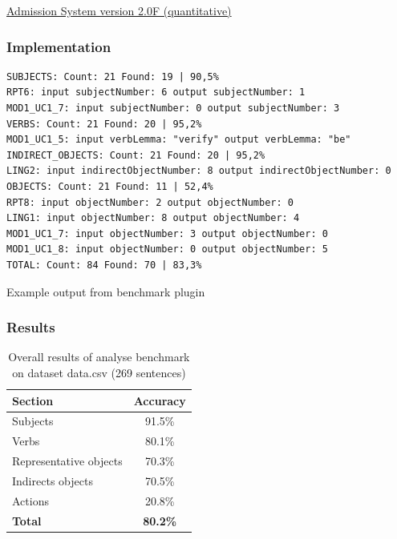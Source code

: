 \href{http://ucdb.cs.put.poznan.pl/benchmark/2.f.n/srs/index.html}{Admission System version 2.0F (quantitative)}


\subsubsection{Implementation}

\begin{table}[ht]   %
\begin{center}
    \begin{verbatim}
SUBJECTS: Count: 21 Found: 19 | 90,5%
RPT6: input subjectNumber: 6 output subjectNumber: 1
MOD1_UC1_7: input subjectNumber: 0 output subjectNumber: 3
VERBS: Count: 21 Found: 20 | 95,2%
MOD1_UC1_5: input verbLemma: "verify" output verbLemma: "be"
INDIRECT_OBJECTS: Count: 21 Found: 20 | 95,2%
LING2: input indirectObjectNumber: 8 output indirectObjectNumber: 0
OBJECTS: Count: 21 Found: 11 | 52,4%
RPT8: input objectNumber: 2 output objectNumber: 0
LING1: input objectNumber: 8 output objectNumber: 4
MOD1_UC1_7: input objectNumber: 3 output objectNumber: 0
MOD1_UC1_8: input objectNumber: 0 output objectNumber: 5
TOTAL: Count: 84 Found: 70 | 83,3%
    \end{verbatim}
  \caption{Example output from benchmark plugin}
  \label{tab.benchmarkexample}
\end{center}
\end{table}   
      
\subsubsection{Results}
                        
\begin{table}[ht]   %
\begin{center}
    \begin{tabular}{|l|c|}
      \hline
      {\bf Section} & {\bf Accuracy} \\
      \hline
      Subjects               & 91.5\% \\
      Verbs                  & 80.1\% \\
      Representative objects & 70.3\% \\
      Indirects objects      & 70.5\% \\
      Actions                & 20.8\% \\
      \hline
      {\bf Total} & {\bf 80.2\%} \\
      \hline
    \end{tabular}
 \caption{Overall results of analyse benchmark on dataset data.csv (269 sentences)}
 \label{tab.benchmark}
\end{center}
\end{table}

